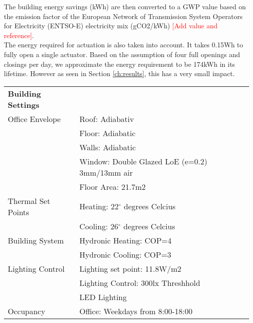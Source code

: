 The building energy savings (kWh) are then converted to a GWP value based on the emission factor of the European Network of Transmission System Operators for Electricity (ENTSO-E) electricity mix (gCO2/kWh) \textcolor{red}{[Add value and reference]}. \\

The energy required for actuation is also taken into account. It takes 0.15Wh to fully open a single actuator. Based on the assumption of four full openings and closings per day, we approximate the energy requirement to be 174kWh in its lifetime. However as seen in Section \ref{ch:results}, this has a very small impact.\\

\begin{table}[H]
\centering
\begin{tabular}{ll}
\hline
\textbf{Building Settings}    &                                                \\
Office Envelope               & Roof: Adiabativ                                \\
                              & Floor: Adiabatic                               \\
                              & Walls: Adiabatic                               \\
                              & Window: Double Glazed LoE (e=0.2) 3mm/13mm air \\
                              & Floor Area: 21.7m2                             \\
Thermal Set Points            & Heating: 22$^{\circ}$ degrees Celcius                    \\
                              & Cooling: 26$^{\circ}$ degrees Celcius                    \\
Building System               & Hydronic Heating: COP=4                        \\
                              & Hydronic Cooling: COP=3                         \\
Lighting Control              & Lighting set point: 11.8W/m2                   \\
                              & Lighting Control: 300lx Threshhold           \\
                              & LED Lighting                                   \\
Occupancy                     & Office: Weekdays from 8:00-18:00               \\

\end{tabular}
\end{table}
